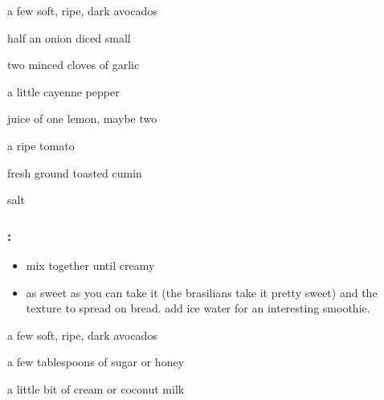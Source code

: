 \begin{ingredients}
  \item a few soft, ripe, dark avocados
  \item half an onion diced small
  \item two minced cloves of garlic
  \item a little cayenne pepper
  \item juice of one lemon, maybe two
  \item a ripe tomato
  \item fresh ground toasted cumin
  \item salt
\end{ingredients}

\subsubsection{:}

\begin{itemize}
  \item mix together until creamy
  \item as sweet as you can take it (the brasilians take it pretty sweet) and 
  the texture to spread on bread. add ice water for an interesting smoothie.
\end{itemize}

\begin{ingredients}
  \item a few soft, ripe, dark avocados
  \item a few tablespoons of sugar or honey
  \item a little bit of cream or coconut milk
\end{ingredients}
